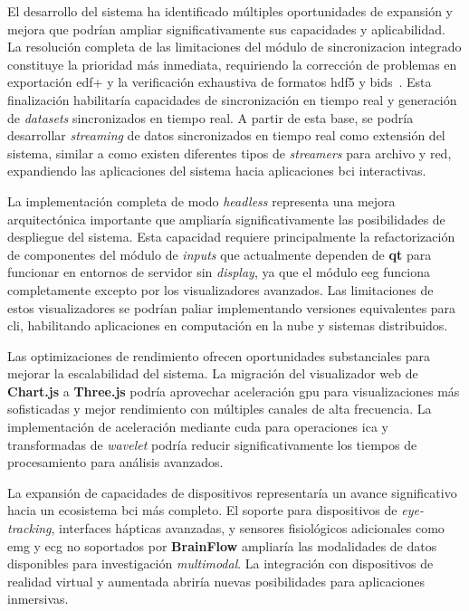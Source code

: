 El desarrollo del sistema ha identificado múltiples oportunidades de expansión y mejora que podrían ampliar significativamente sus capacidades y aplicabilidad. La resolución completa de las limitaciones del módulo de \gls{sincronizacion} integrado constituye la prioridad más inmediata, requiriendo la corrección de problemas en exportación \acrshort{edf+} y la verificación exhaustiva de formatos \acrshort{hdf5} y \acrshort{bids}~\cite{bids}. Esta finalización habilitaría capacidades de sincronización en tiempo real y generación de \textit{\glspl{dataset}} sincronizados en tiempo real. A partir de esta base, se podría desarrollar \textit{\gls{streaming}} de datos sincronizados en tiempo real como extensión del sistema, similar a como existen diferentes tipos de \textit{streamers} para archivo y red, expandiendo las aplicaciones del sistema hacia aplicaciones \acrshort{bci} interactivas.

La implementación completa de modo \textit{\gls{headless}} representa una mejora arquitectónica importante que ampliaría significativamente las posibilidades de despliegue del sistema. Esta capacidad requiere principalmente la refactorización de componentes del módulo de \textit{inputs} que actualmente dependen de \textbf{\acrshort{qt}} para funcionar en entornos de servidor sin \textit{display}, ya que el módulo \acrshort{eeg} funciona completamente excepto por los visualizadores avanzados. Las limitaciones de estos visualizadores se podrían paliar implementando versiones equivalentes para \acrshort{cli}, habilitando aplicaciones en computación en la nube y sistemas distribuidos.

Las optimizaciones de rendimiento ofrecen oportunidades substanciales para mejorar la escalabilidad del sistema. La migración del visualizador web de \textbf{Chart.js} a \textbf{Three.js} podría aprovechar aceleración \acrshort{gpu} para visualizaciones más sofisticadas y mejor rendimiento con múltiples canales de alta frecuencia. La implementación de aceleración mediante \gls{cuda} para operaciones \acrshort{ica} y transformadas de \textit{\gls{wavelet}} podría reducir significativamente los tiempos de procesamiento para análisis avanzados.

La expansión de capacidades de dispositivos representaría un avance significativo hacia un ecosistema \acrshort{bci} más completo. El soporte para dispositivos de \textit{\gls{eye-tracking}}, interfaces hápticas avanzadas, y sensores fisiológicos adicionales como \acrshort{emg} y \acrshort{ecg} no soportados por \textbf{BrainFlow} ampliaría las modalidades de datos disponibles para investigación \textit{multimodal}. La integración con dispositivos de realidad virtual y aumentada abriría nuevas posibilidades para aplicaciones inmersivas.

